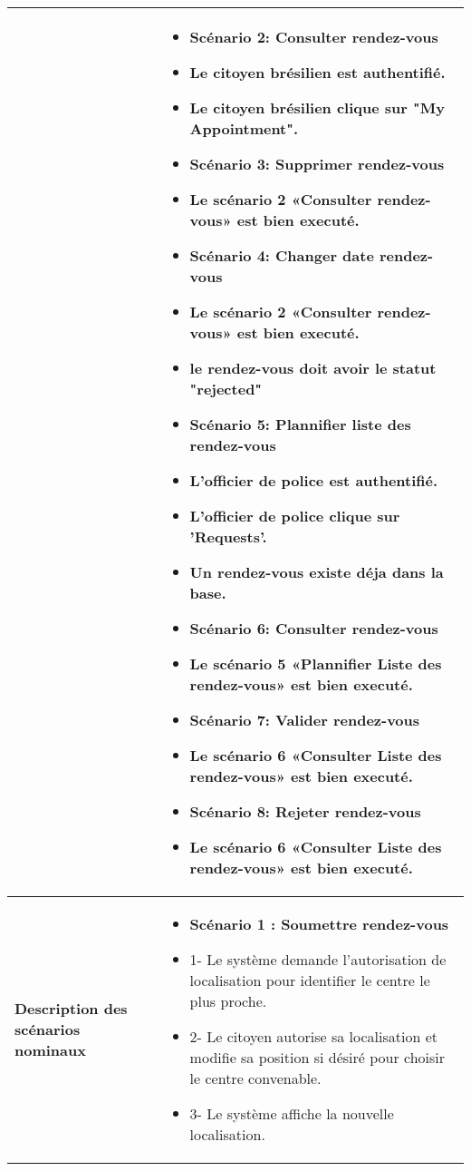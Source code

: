 \begin{longtable}{|>{\arraybackslash}p{4.2cm}|>{\arraybackslash}p{12.5cm}|}
\hline
\textbf{} &
\begin{itemize}[label=]
 \item\textbf{Scénario 2: Consulter rendez-vous }
 \item  Le citoyen brésilien est authentifié.
 \item  Le citoyen brésilien clique sur "My Appointment".
 \item\textbf{Scénario 3: Supprimer rendez-vous }
 \item   Le scénario 2 «Consulter rendez-vous» est bien executé.
 \item\textbf{Scénario 4: Changer date rendez-vous}
 \item Le scénario 2 «Consulter rendez-vous» est bien executé.
 \item le rendez-vous doit avoir le statut "rejected"
 \item\textbf{Scénario 5: Plannifier liste des rendez-vous }
 \item L'officier de police est authentifié.
 \item L'officier de police clique sur 'Requests'.
 \item Un rendez-vous existe déja dans la base.
 \item\textbf{Scénario 6: Consulter rendez-vous }
 \item Le scénario 5 «Plannifier Liste des rendez-vous» est bien executé.
 \item\textbf{Scénario 7: Valider rendez-vous }
 \item   Le scénario 6 «Consulter Liste des rendez-vous» est bien executé.
 \item\textbf{Scénario 8: Rejeter rendez-vous}
 \item Le scénario 6 «Consulter Liste des rendez-vous» est bien executé.
\end{itemize} \\
\hline
\textbf{Description des scénarios nominaux} &
\begin{itemize}[label=]
\item \textbf{Scénario 1 : Soumettre rendez-vous}
        \item 1- Le système demande l'autorisation de localisation pour identifier le centre le plus proche.
        \item 2- Le citoyen autorise sa localisation et modifie sa position si désiré pour choisir le centre convenable.
        \item 3- Le système affiche la nouvelle localisation.
\end{itemize}\\





\end{longtable}
